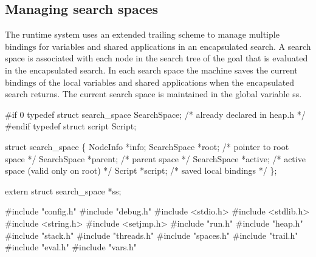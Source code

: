 %
%
\subsection{Managing search spaces}
The runtime system uses an extended trailing scheme to manage multiple
bindings for variables and shared applications in an encapsulated
search. A search space is associated with each node in the search tree
of the goal that is evaluated in the encapsulated search. In each
search space the machine saves the current bindings of the local
variables and shared applications when the encapsulated search
returns. The current search space is maintained in the global variable
{\Tt{}ss\nwendquote}.

\nwenddocs{}\endmoddef\nwstartdeflinemarkup{}\nwenddeflinemarkup
#if 0
typedef struct search_space SearchSpace; /* already declared in heap.h */
#endif
typedef struct script Script;

struct search_space \{
    NodeInfo    *info;
    SearchSpace *root;          /* pointer to root space */
    SearchSpace *parent;        /* parent space */
    SearchSpace *active;        /* active space (valid only on root) */
    Script      *script;        /* saved local bindings */
\};

extern struct search_space *ss;

\nwendcode{}\nwdocspar
\nwenddocs{}\endmoddef\nwstartdeflinemarkup{}\nwenddeflinemarkup
#include "config.h"
#include "debug.h"
#include <stdio.h>
#include <stdlib.h>
#include <string.h>
#include <setjmp.h>
#include "run.h"
#include "heap.h"
#include "stack.h"
#include "threads.h"
#include "spaces.h"
#include "trail.h"
#include "eval.h"
#include "vars.h"

